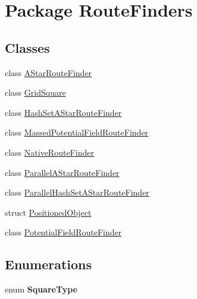 \hypertarget{namespace_route_finders}{\section{Package Route\-Finders}
\label{namespace_route_finders}
}
\subsection*{Classes}
\begin{DoxyCompactItemize}
\item 
class \hyperlink{class_route_finders_1_1_a_star_route_finder}{A\-Star\-Route\-Finder}
\item 
class \hyperlink{class_route_finders_1_1_grid_square}{Grid\-Square}
\item 
class \hyperlink{class_route_finders_1_1_hash_set_a_star_route_finder}{Hash\-Set\-A\-Star\-Route\-Finder}
\item 
class \hyperlink{class_route_finders_1_1_massed_potential_field_route_finder}{Massed\-Potential\-Field\-Route\-Finder}
\item 
class \hyperlink{class_route_finders_1_1_native_route_finder}{Native\-Route\-Finder}
\item 
class \hyperlink{class_route_finders_1_1_parallel_a_star_route_finder}{Parallel\-A\-Star\-Route\-Finder}
\item 
class \hyperlink{class_route_finders_1_1_parallel_hash_set_a_star_route_finder}{Parallel\-Hash\-Set\-A\-Star\-Route\-Finder}
\item 
struct \hyperlink{struct_route_finders_1_1_positioned_object}{Positioned\-Object}
\item 
class \hyperlink{class_route_finders_1_1_potential_field_route_finder}{Potential\-Field\-Route\-Finder}
\end{DoxyCompactItemize}
\subsection*{Enumerations}
\begin{DoxyCompactItemize}
\item 
enum {\bfseries Square\-Type} 
\end{DoxyCompactItemize}
